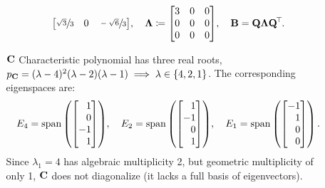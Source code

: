\documentclass[11pt]{article}
\begin{document}
\begin{enumerate}
\begin{enumerate}[align=left]
\[\begin{bmatrix*}[r]
                            \sfrac{\sqrt{3}}{3} & 0                    & \sfrac{-\sqrt{6}}{3} \\
                        \end{bmatrix*}
                        \!,
                        \quad
                        \mat{\Lambda} \coloneq
                        \begin{bmatrix}
                            3 & 0 & 0 \\
                            0 & 0 & 0 \\
                            0 & 0 & 0 \\
                        \end{bmatrix}
                        \!,
                        \quad
                        \mat{B} = \mat{Q} \mat{\Lambda} \mat{Q}^{\T}.
                    \]

              \item[$\mathbf{C}$] Characteristic polynomial has three real roots, $p_{\mathbf{C}} = (\lambda
                        - 4)^2(\lambda - 2)(\lambda - 1) \implies \lambda \in \left\{4, 2, 1\right\}$.  The
                    corresponding eigenspaces are:
                    \[
                        E_4 = \Span \args{
                            \begin{bmatrix*}[r]
                                1 \\ 0 \\ -1 \\ 1
                            \end{bmatrix*}
                        }
                        \! , \quad
                        E_2 = \Span \args{
                            \begin{bmatrix*}[r]
                                1 \\ -1 \\ 0 \\ 1
                            \end{bmatrix*}
                        }
                        \! , \quad
                        E_1 = \Span \args{
                            \begin{bmatrix*}[r]
                                -1 \\ 1 \\ 0 \\ 0
                            \end{bmatrix*}
                        }.
                    \]
                    Since $\lambda_1 = 4$ has algebraic multiplicity 2, but geometric multiplicity
                    of only 1, $\mathbf{C}$ does not diagonalize (it lacks a full basis of
                    eigenvectors).


\end{enumerate}
\end{enumerate}
\end{document}
